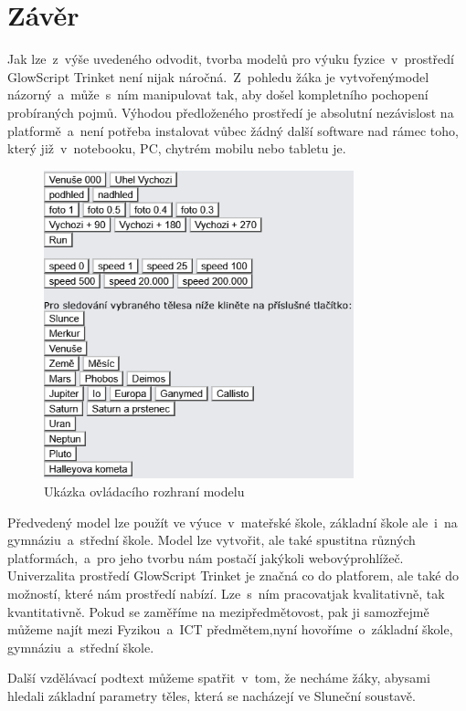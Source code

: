 \documentclass[FM,BP]{tulthesis}
\begin{document}
\chapter{Závěr}
Jak lze~z~výše uvedeného odvodit, tvorba modelů pro výuku fyzice~v~prostředí GlowScript Trinket není nijak náročná.~Z~pohledu žáka je vytvořenýmodel názorný~a~může~s~ním manipulovat tak, aby došel kompletního pochopení probíraných pojmů. Výhodou předloženého prostředí je absolutní nezávislost na platformě~a~není potřeba instalovat vůbec žádný další software nad rámec toho, který již~v~notebooku, PC, chytrém mobilu nebo tabletu je.
\begin{figure}[ht]
\centering
\includegraphics[width=0.8\textwidth]{img4.png}
\caption{Ukázka ovládacího rozhraní modelu}
\label{obr4}
\end{figure}

Předvedený model lze použít ve výuce~v~mateřské škole, základní škole ale~i~na gymnáziu~a~střední škole. Model lze vytvořit, ale také spustitna různých platformách,~a~pro jeho tvorbu nám postačí jakýkoli webovýprohlížeč. Univerzalita prostředí GlowScript Trinket je značná co do platforem, ale také do možností, které nám prostředí nabízí. Lze~s~ním pracovatjak kvalitativně, tak kvantitativně. Pokud se zaměříme na mezipředmětovost, pak ji samozřejmě můžeme najít mezi Fyzikou~a~ICT předmětem,nyní hovoříme~o~základní škole, gymnáziu~a~střední škole.

Další vzdělávací podtext můžeme spatřit~v~tom, že necháme žáky, abysami hledali základní parametry těles, která se nacházejí ve Sluneční soustavě.
\medskip

\nocite{*}

\printbibliography[title={Použitá literatura}] %
\end{document}
